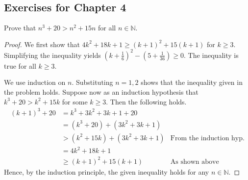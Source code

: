 \documentclass[../main.tex]{subfiles}
\begin{document}
\subsection{Exercises for Chapter 4}
\begin{exercise}
    Prove that $n^3 + 20 > n^2 + 15n$ for all $n \in \mathbb N$.
\end{exercise}
\begin{proof}
    We first show that $4k^2 + 18k + 1 \geq (k + 1)^2 + 15(k + 1)$ for $k \geq 3$.
    Simplifying the inequality yields $\left( k + \frac 1 6 \right)^2 - \left(5 + \frac{1}{36}\right) \geq 0$.
    The inequality is true for all $k \geq 3$.

    We use induction on $n$.
    Substituting $n = 1, 2$ shows that the inequality given in the problem holds.
    Suppose now as an induction hypothesis that $k^3 + 20 > k^2 + 15k$ for some $k \geq 3$.
    Then the following holds.
    \begin{align*}
        (k + 1)^3 + 20 &= k^3 + 3k^2 + 3k + 1 + 20\\
                       &= (k^3 + 20) + (3k^2 + 3k + 1)\\
                       &> (k^2 + 15k) + (3k^2 + 3k + 1) &\text{From the induction hyp.}\\
                       &= 4k^2 + 18k + 1\\
                       &\geq (k + 1)^2 + 15(k + 1) &\text{As shown above}
    \end{align*}
    Hence, by the induction principle, the given inequality holds for any $n \in \mathbb N$.
\end{proof}
\end{document}
